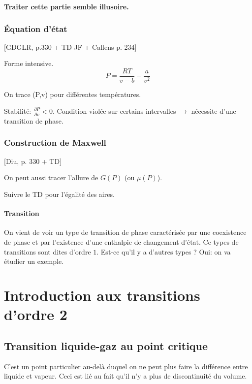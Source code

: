 \documentclass[11pt]{report}
\numberwithin{figure}{section}
\numberwithin{equation}{section}
\numberwithin{table}{section}
\newcommand{\1}{\boldsymbol{1}}
\begin{document}
\textbf{Traiter cette partie semble illusoire.}

\subsubsection{Équation d'état}

[GDGLR, p.330 + TD JF + Callens p. 234] 

Forme intensive.
\begin{equation}
P = \frac{RT}{v - b} - \frac{a}{v^2}
\end{equation}

On trace (P,v) pour différentes températures.

Stabilité: $\frac{\partial P}{\partial v} < 0$. Condition violée sur certains intervalles $\rightarrow$ nécessite d'une transition de phase.

\subsubsection{Construction de Maxwell}

[Diu, p. 330 + TD]

On peut aussi tracer l'allure de $G(P)$ (ou $\mu(P)$).

Suivre le TD pour l'égalité des aires.



\paragraph{Transition} On vient de voir un type de transition de phase caractérisée par une coexistence de phase et par l'existence d'une enthalpie de changement d'état. Ce types de transitions sont dites d'ordre $1$. Est-ce qu'il y a d'autres types ? Oui: on va étudier un exemple.


\section{Introduction aux transitions d'ordre 2}

\subsection{Transition liquide-gaz au point critique}

C’est un point particulier au-delà duquel on ne peut plus faire la différence entre liquide et vapeur. Ceci est lié au fait qu’il n’y a plus de discontinuité du volume. 
\end{document}
